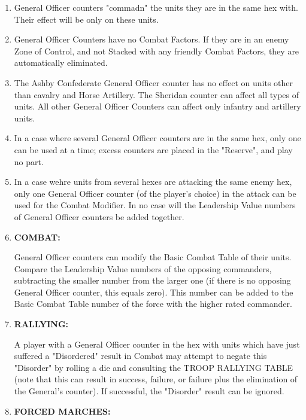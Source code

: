 \begin{enumerate}
  \item General Officer counters "commadn" the units they are in the same hex with. Their effect will be only on these units.

  \item General Officer Counters have no Combat Factors. If they are in an enemy Zone of Control, and not Stacked with any friendly Combat Factors, they are automatically eliminated.

  \item The Ashby Confederate General Officer counter has no effect on units other than cavalry and Horse Artillery. The Sheridan counter can affect all types of units. All other General Officer Counters can affect only infantry and artillery units.

  \item In a case where several General Officer counters are in the same hex, only one can be used at a time; excess counters are placed in the "Reserve", and play no part.

  \item In a case wehre units from several hexes are attacking the same enemy hex, only one General Officer counter (of the player's choice) in the attack can be used for the Combat Modifier. In no case will the Leadership Value numbers of General Officer counters be added together.

  \item \textbf{COMBAT:}

  General Officer counters can modify the Basic Combat Table of their units. Compare the Leadership Value numbers of the opposing commanders, subtracting the smaller number from the larger one (if there is no opposing General Officer counter, this equals zero). This number can be added to the Basic Combat Table number of the force with the higher rated commander.

  \item \textbf{RALLYING:}

  A player with a General Officer counter in the hex with units which have just suffered a "Disordered" result in Combat may attempt to negate this "Disorder" by rolling a die and consulting the TROOP RALLYING TABLE (note that this can result in success, failure, or failure plus the elimination of the General's counter). If successful, the "Disorder" result can be ignored.

  \item \textbf{FORCED MARCHES:}


\end{enumerate}
